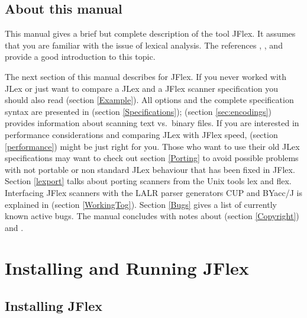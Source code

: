 \documentclass[11pt]{scrartcl}
\begin{document}
\subsection{About this manual}
This manual gives a brief but complete description of the tool JFlex. It
assumes that you are familiar with the issue of lexical analysis. The references \cite{Aho},
\cite{Appel}, and \cite{Maurer} provide a good introduction to this topic.

The next section of this manual describes  
for JFlex. If you never worked with JLex or
just want to compare a JLex and a JFlex scanner specification you
should also read  
(section \ref{Example}).  All options and the complete
specification syntax are presented in 
 (section \ref{Specifications});
 (section \ref{sec:encodings})
provides information about scanning text vs.~binary files.
If you are interested in performance
considerations and comparing JLex with JFlex speed, 
 (section \ref{performance})
might be just right for you. Those who want to
use their old JLex specifications may want to check out section \ref{Porting}
 to avoid possible problems
with not portable or non standard JLex behaviour that has been fixed in
JFlex. Section \ref{lexport} talks about porting scanners from the
Unix tools lex and flex.  Interfacing JFlex scanners with the LALR
parser generators CUP and BYacc/J is explained in  (section \ref{WorkingTog}).  Section \ref{Bugs}
 gives a list of currently known active bugs. 
The manual concludes with notes about 
 (section \ref{Copyright}) and
.


\section{Installing and Running JFlex\label{Installing}}

\subsection{Installing JFlex}
\end{document}
